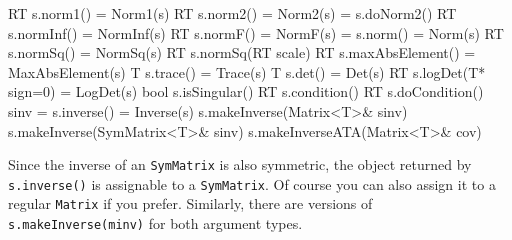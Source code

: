 \documentclass[twoside,letterpaper,11pt]{article}
\renewcommand{\tt}[1]{{\lstinline {#1}}}
\begin{document}
\begin{tmvcode}
RT s.norm1() = Norm1(s)
RT s.norm2() = Norm2(s) = s.doNorm2()
RT s.normInf() = NormInf(s)
RT s.normF() = NormF(s) = s.norm() = Norm(s)
RT s.normSq() = NormSq(s)
RT s.normSq(RT scale)
RT s.maxAbsElement() = MaxAbsElement(s)
T s.trace() = Trace(s)
T s.det() = Det(s)
RT s.logDet(T* sign=0) = LogDet(s)
bool s.isSingular()
RT s.condition()
RT s.doCondition()
sinv = s.inverse() = Inverse(s)
s.makeInverse(Matrix<T>& sinv)
s.makeInverse(SymMatrix<T>& sinv)
s.makeInverseATA(Matrix<T>& cov)
\end{tmvcode}
Since the inverse of an \tt{SymMatrix} is also symmetric,
the object returned by \tt{s.inverse()} is 
assignable to a \tt{SymMatrix}.  Of course you can also assign it
to a regular \tt{Matrix} if you prefer.  Similarly, there are versions
of \tt{s.makeInverse(minv)} for both argument types.  
\end{document}
